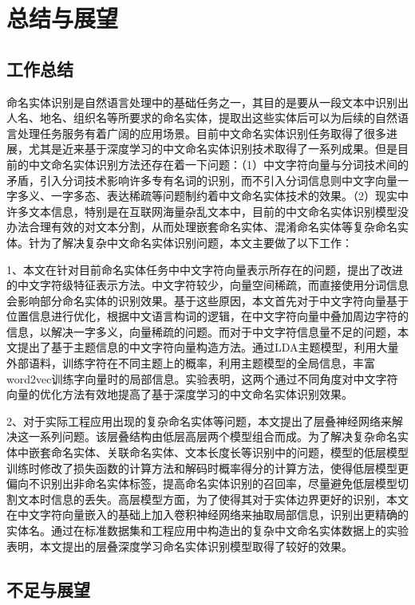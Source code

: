 \documentclass[winfonts,master,oneside,nobackinfo]{njuthesis}
\begin{document}
\chapter{总结与展望}

\section{工作总结}

命名实体识别是自然语言处理中的基础任务之一，其目的是要从一段文本中识别出人名、地名、组织名等所要求的命名实体，提取出这些实体后可以为后续的自然语言处理任务服务有着广阔的应用场景。目前中文命名实体识别任务取得了很多进展，尤其是近来基于深度学习的中文命名实体识别技术取得了一系列成果。但是目前的中文命名实体识别方法还存在着一下问题：（1）中文字符向量与分词技术间的矛盾，引入分词技术影响许多专有名词的识别，而不引入分词信息则中文字向量一字多义、一字多态、表达稀疏等问题制约着中文命名实体技术的效果。（2）现实中许多文本信息，特别是在互联网海量杂乱文本中，目前的中文命名实体识别模型没办法合理有效的对文本分割，从而处理嵌套命名实体、混淆命名实体等复杂命名实体。针为了解决复杂中文命名实体识别问题，本文主要做了以下工作：

1、本文在针对目前命名实体任务中中文字符向量表示所存在的问题，提出了改进的中文字符级特征表示方法。中文字符较少，向量空间稀疏，而直接使用分词信息会影响部分命名实体的识别效果。基于这些原因，本文首先对于中文字符向量基于位置信息进行优化，根据中文语言构词的逻辑，在中文字符向量中叠加周边字符的信息，以解决一字多义，向量稀疏的问题。而对于中文字符信息量不足的问题，本文提出了基于主题信息的中文字符向量构造方法。通过LDA主题模型，利用大量外部语料，训练字符在不同主题上的概率，利用主题模型的全局信息，丰富word2vec训练字向量时的局部信息。实验表明，这两个通过不同角度对中文字符向量的优化方法有效地提高了基于深度学习的中文命名实体识别效果。

2、对于实际工程应用出现的复杂命名实体等问题，本文提出了层叠神经网络来解决这一系列问题。该层叠结构由低层高层两个模型组合而成。为了解决复杂命名实体中嵌套命名实体、关联命名实体、文本长度长等识别中的问题，模型的低层模型训练时修改了损失函数的计算方法和解码时概率得分的计算方法，使得低层模型更偏向不识别出非命名实体标签，提高命名实体识别的召回率，尽量避免低层模型切割文本时信息的丢失。高层模型方面，为了使得其对于实体边界更好的识别，本文在中文字符向量嵌入的基础上加入卷积神经网络来抽取局部信息，识别出更精确的实体名。通过在标准数据集和工程应用中构造出的复杂中文命名实体数据上的实验表明，本文提出的层叠深度学习命名实体识别模型取得了较好的效果。

\section{不足与展望}
\end{document}
